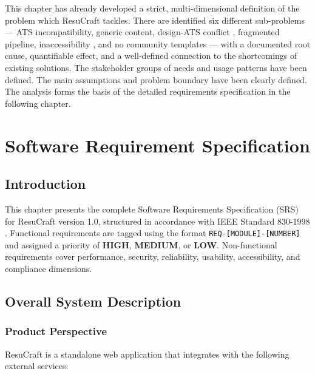 \documentclass[12pt, a4paper, oneside]{report}
\begin{document}
This chapter has already developed a strict, multi-dimensional definition of the problem which ResuCraft tackles. There are identified six different sub-problems --- ATS incompatibility\cite{jobscan2021}, generic content, design-ATS conflict \cite{resumeworded2022}, fragmented pipeline, inaccessibility \cite{wcag21}, and no community templates --- with a documented root cause, quantifiable effect, and a well-defined connection to the shortcomings of existing solutions. The stakeholder groups of needs and usage patterns have been defined. The main assumptions and problem boundary have been clearly defined. The analysis forms the basis of the detailed requirements specification in the following chapter.

\chapter{Software Requirement Specification}

\section{Introduction}

This chapter presents the complete Software Requirements Specification (SRS) for ResuCraft version 1.0, structured in accordance with IEEE Standard 830-1998 \cite{ieee830}. Functional requirements are tagged using the format \texttt{REQ-[MODULE]-[NUMBER]} and assigned a priority of \textbf{HIGH}, \textbf{MEDIUM}, or \textbf{LOW}. Non-functional requirements cover performance, security, reliability, usability, accessibility, and compliance dimensions.

\section{Overall System Description}

\subsection{Product Perspective}

ResuCraft is a standalone web application that integrates with the following external services:
\end{document}
